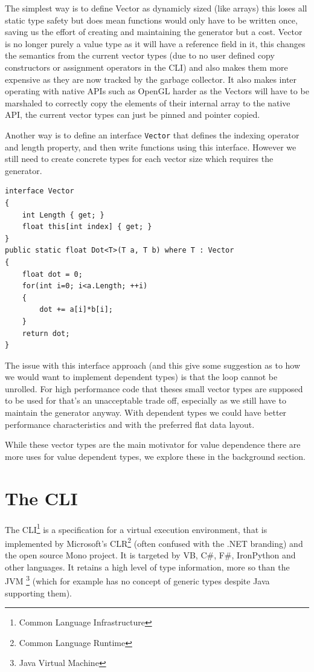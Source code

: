 \documentclass[english]{report}
\begin{document}
The simplest way is to define Vector as dynamicly sized (like arrays)
this loses all static type safety but does mean functions would only
have to be written once, saving us the effort of creating and maintaining
the generator but a cost. Vector is no longer purely a value type
as it will have a reference field in it, this changes the semantics
from the current vector types (due to no user defined copy constructors
or assignment operators in the CLI) and also makes them more expensive
as they are now tracked by the garbage collector. It also makes inter
operating with native APIs such as OpenGL harder as the Vectors will
have to be marshaled to correctly copy the elements of their internal
array to the native API, the current vector types can just be pinned
and pointer copied.

Another way is to define an interface \texttt{Vector} that defines
the indexing operator and length property, and then write functions
using this interface. However we still need to create concrete types
for each vector size which requires the generator.

\begin{lstlisting}[keywordstyle={\color{blue}},language=sharpc]
interface Vector
{
	int Length { get; }
	float this[int index] { get; }
}
public static float Dot<T>(T a, T b) where T : Vector
{
	float dot = 0;
	for(int i=0; i<a.Length; ++i)
	{
		dot += a[i]*b[i];
	}
	return dot;
}
\end{lstlisting}


The issue with this interface approach (and this give some suggestion
as to how we would want to implement dependent types) is that the
loop cannot be unrolled. For high performance code that theses small
vector types are supposed to be used for that's an unacceptable trade
off, especially as we still have to maintain the generator anyway.
With dependent types we could have better performance characteristics
and with the preferred flat data layout. 

While these vector types are the main motivator for value dependence
there are more uses for value dependent types, we explore these in
the background section.

\section[The Common Language Infrastructure]{The CLI}

The CLI\footnote{Common Language Infrastructure} is a specification for a
virtual execution environment, that is implemented by Microsoft's
CLR\footnote{Common Language Runtime} (often confused with the .NET branding)
and the open source Mono project. It is targeted by VB, C\#, F\#, IronPython
and other languages.  It retains a high level of type information, more so than
the JVM \footnote{Java Virtual Machine} (which for example has no concept of
generic types despite Java supporting them\cite{jvm-erasure}).
\end{document}
